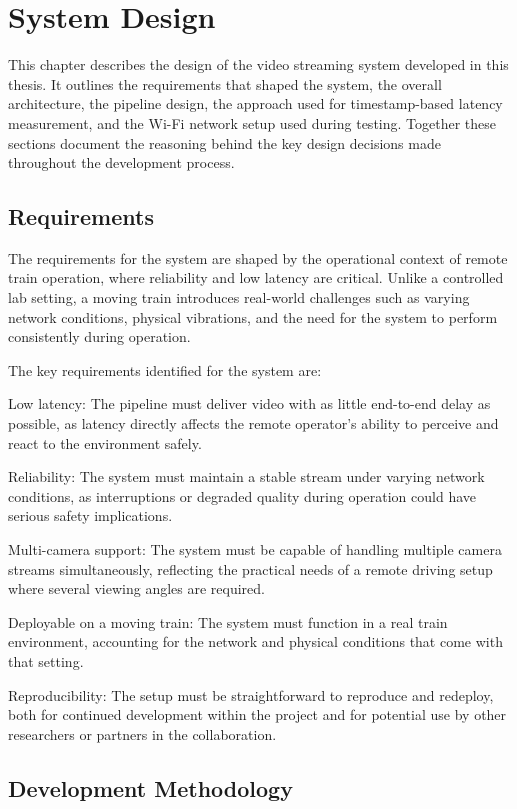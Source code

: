\section{System Design}\label{chap:systemdesign}
This chapter describes the design of the video streaming system developed in this thesis. It outlines the requirements that shaped the system, the overall architecture, the pipeline design, the approach used for timestamp-based latency measurement, and the Wi-Fi network setup used during testing. Together these sections document the reasoning behind the key design decisions made throughout the development process.

\subsection{Requirements}
The requirements for the system are shaped by the operational context of remote train operation, where reliability and low latency are critical. Unlike a controlled lab setting, a moving train introduces real-world challenges such as varying network conditions, physical vibrations, and the need for the system to perform consistently during operation.

The key requirements identified for the system are:

Low latency: The pipeline must deliver video with as little end-to-end delay as possible, as latency directly affects the remote operator's ability to perceive and react to the environment safely.

Reliability: The system must maintain a stable stream under varying network conditions, as interruptions or degraded quality during operation could have serious safety implications.

Multi-camera support: The system must be capable of handling multiple camera streams simultaneously, reflecting the practical needs of a remote driving setup where several viewing angles are required.

Deployable on a moving train: The system must function in a real train environment, accounting for the network and physical conditions that come with that setting.

Reproducibility: The setup must be straightforward to reproduce and redeploy, both for continued development within the project and for potential use by other researchers or partners in the collaboration.

\subsection{Development Methodology}
